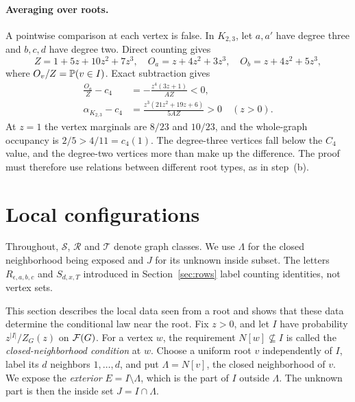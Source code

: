 \documentclass[11pt]{article}
\begin{document}
\paragraph{Averaging over roots.}
A pointwise comparison at each vertex is false. In $K_{2,3}$, let $a,a'$ have degree three and $b,c,d$ have degree two. Direct counting gives
\[
 Z=1+5z+10z^2+7z^3,\quad O_a=z+4z^2+3z^3,\quad O_b=z+4z^2+5z^3,
\]
where $O_v/Z=\mathbb P(v\in I)$. Exact subtraction gives
\begin{align*}
 \frac{O_a}{Z}-c_4&=-\frac{z^4(3z+1)}{AZ}<0,\\
 \alpha_{K_{2,3}}-c_4&=\frac{z^3(21z^2+19z+6)}{5AZ}>0\quad(z>0).
\end{align*}
At $z=1$ the vertex marginals are $8/23$ and $10/23$, and the whole-graph occupancy is $2/5>4/11=c_4(1)$. The degree-three vertices fall below the $C_4$ value, and the degree-two vertices more than make up the difference. The proof must therefore use relations between different root types, as in step~(b). 

\section{Local configurations}\label{sec:views}
Throughout, $\mathcal S$, $\mathcal R$ and $\mathcal T$ denote graph classes. We use $\Lambda$ for the closed neighborhood being exposed and $J$ for its unknown inside subset. The letters $R_{\epsilon,a,b,c}$ and $S_{d,x,T}$ introduced in Section~\ref{sec:rows} label counting identities, not vertex sets.

This section describes the local data seen from a root and shows that these data determine the conditional law near the root. Fix $z>0$, and let $I$ have probability $z^{|I|}/Z_G(z)$ on $\mathcal F(G)$. For a vertex $w$, the requirement $N[w]\nsubseteq I$ is called the \emph{closed-neighborhood condition} at $w$. Choose a uniform root $v$ independently of $I$, label its $d$ neighbors $1,\ldots,d$, and put $\Lambda=N[v]$, the closed neighborhood of $v$. We expose the \emph{exterior} $E=I\setminus \Lambda$, which is the part of $I$ outside $\Lambda$. The unknown part is then the inside set $J=I\cap \Lambda$.
\end{document}
